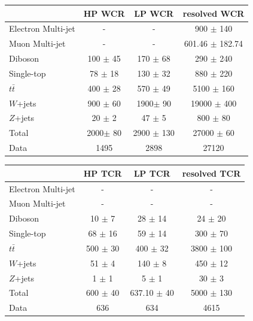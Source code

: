\begin{table}
\begin{tabular}{|l|c|c|c|}
\hline
	  &	 HP WCR &	 LP WCR &	resolved WCR \\\hline 
	Electron Multi-jet &	- &	- &	900 $\pm$ 140 \\\hline 
	Muon Multi-jet &	- &	- &	601.46 $\pm$ 182.74 \\\hline 
	Diboson &	100 $\pm$ 45 &	170 $\pm$ 68 &	290 $\pm$ 240 \\\hline 
	Single-top &	78 $\pm$ 18 &	130 $\pm$ 32 &	880 $\pm$ 220 \\\hline 
	$t\bar{t}$ &	400 $\pm$ 28 &	570 $\pm$ 49 &	5100 $\pm$ 160 \\\hline 
	$W$+jets &	900 $\pm$ 60 &	1900$\pm$ 90 &	19000 $\pm$ 400 \\\hline 
	$Z$+jets &	20 $\pm$ 2 &	47 $\pm$ 5 &	800 $\pm$ 80 \\\hline 
	Total &	2000$\pm$ 80 &	2900 $\pm$ 130 &	27000 $\pm$ 60 \\\hline 
	Data &	1495 &	2898 &	27120 \\\hline 
\end{tabular}

\begin{tabular}{|l|c|c|c|}
\hline
	  &	 HP TCR &	 LP TCR &	resolved TCR \\\hline 
	Electron Multi-jet &	- &	- &	- \\\hline 
	Muon Multi-jet &	- &	- &	- \\\hline 
	Diboson &	10 $\pm$ 7 &	28 $\pm$ 14 &	24 $\pm$ 20\\\hline 
	Single-top &	68 $\pm$ 16 &	59 $\pm$ 14 &	300 $\pm$ 70 \\\hline 
	$t\bar{t}$ &	500 $\pm$ 30 &	400 $\pm$ 32 &	3800 $\pm$ 100 \\\hline 
	$W$+jets &	51 $\pm$ 4 &	140 $\pm$ 8&	450 $\pm$ 12 \\\hline 
	$Z$+jets &	1 $\pm$ 1 &	5 $\pm$ 1 &	30 $\pm$ 3 \\\hline 
	Total &	600 $\pm$ 40&	637.10 $\pm$ 40 &	5000 $\pm$ 130 \\\hline 
	Data &	636 &	634 &	4615 \\\hline 
\end{tabular}


\end{table}
